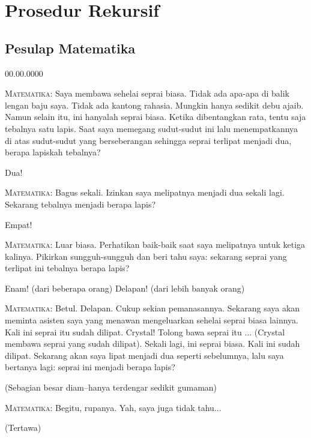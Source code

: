 
\section{\label{sec:Recursion}Prosedur Rekursif}

\subsection{Pesulap Matematika}
\begin{lyxlist}{00.00.0000}
\item [{\textsc{Pesulap}}] \textsc{Matematika:} Saya membawa sehelai seprai
biasa. Tidak ada apa-apa di balik lengan baju saya. Tidak ada kantong
rahasia. Mungkin hanya sedikit debu ajaib. Namun selain itu, ini hanyalah
seprai biasa. Ketika dibentangkan rata, tentu saja tebalnya satu lapis.
Saat saya memegang sudut-sudut ini lalu menempatkannya di atas sudut-sudut
yang berseberangan sehingga seprai terlipat menjadi dua, berapa lapiskah
tebalnya?
\item [{\textsc{Penonton:}}] Dua!
\item [{\textsc{Pesulap}}] \textsc{Matematika:} Bagus sekali. Izinkan saya
melipatnya menjadi dua sekali lagi. Sekarang tebalnya menjadi berapa
lapis?
\item [{\textsc{Penonton:}}] Empat!
\item [{\textsc{Pesulap}}] \textsc{Matematika:} Luar biasa. Perhatikan
baik-baik saat saya melipatnya untuk ketiga kalinya. Pikirkan sungguh-sungguh
dan beri tahu saya: sekarang seprai yang terlipat ini tebalnya berapa
lapis?
\item [{\textsc{Penonton:}}] Enam! (dari beberapa orang) Delapan! (dari
lebih banyak orang)
\item [{\textsc{Pesulap}}] \textsc{Matematika:} Betul. Delapan. Cukup sekian
pemanasannya. Sekarang saya akan meminta asisten saya yang menawan
mengeluarkan sehelai seprai biasa lainnya. Kali ini seprai itu sudah
dilipat. Crystal! Tolong bawa seprai itu ... (Crystal membawa seprai
yang sudah dilipat). Sekali lagi, ini seprai biasa. Kali ini sudah
dilipat. Sekarang akan saya lipat menjadi dua seperti sebelumnya,
lalu saya bertanya lagi: seprai ini menjadi berapa lapis?
\item [{\textsc{Penonton:}}] (Sebagian besar diam--hanya terdengar sedikit
gumaman)
\item [{\textsc{Pesulap}}] \textsc{Matematika:} Begitu, rupanya. Yah, saya
juga tidak tahu...
\item [{\textsc{Penonton:}}] (Tertawa)

\end{lyxlist}

